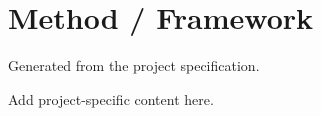 \section{Method / Framework}
Generated from the project specification.

Add project-specific content here.
